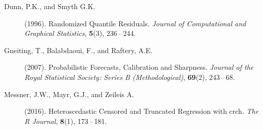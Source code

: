 \documentclass[twoside]{report}
\begin{document}
\begin{description}
    \item [Dunn, P.K., and Smyth G.K.] (1996).
        Randomized Quantile Residuals.
        {\it Journal of Computational and Graphical Statistics},
        {\bf 5}(3), 236\,--\,244.
\item[Gneiting, T., Balabdaoui, F., and Raftery, A.E.] (2007).
    Probabilistic Forecasts, Calibration and Sharpness.
    {\it Journal of the Royal Statistical Society: Series B (Methodological)},
    {\bf 69}(2), 243\,--\,68.
\item [Messner, J.W., Mayr, G.J., and Zeileis A.] (2016).
    Heteroscedastic Censored and Truncated Regression with crch.
    {\it The R Journal},
    {\bf 8}(1), 173\,--\,181.
\end{description}
\end{document}

